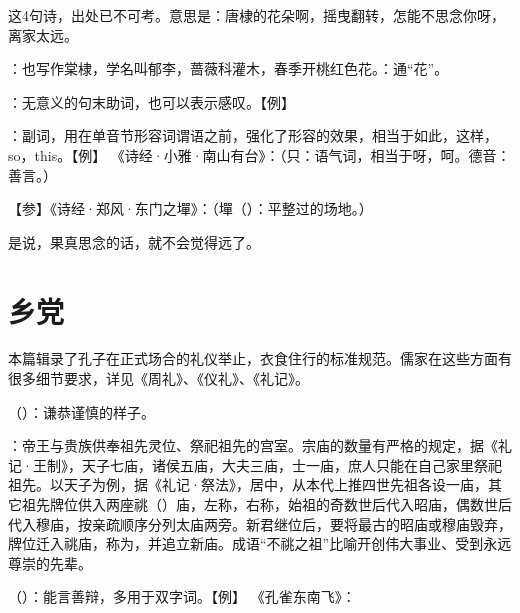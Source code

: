 {
\item {}这4句诗，出处已不可考。意思是：唐棣的花朵啊，摇曳翻转，怎能不思念你呀，离家太远。

：也写作棠棣，学名叫郁李，蔷薇科灌木，春季开桃红色花。：通“花”。

：无意义的句末助词，也可以表示感叹。【例】 

：副词，用在单音节形容词谓语之前，强化了形容的效果，相当于如此，这样，so，this。【例】 《诗经·小雅·南山有台》：（只：语气词，相当于呀，呵。德音：善言。）

【参】《诗经·郑风·东门之墠》：（墠（）：平整过的场地。）

\item {}是说，果真思念的话，就不会觉得远了。
}
{}



\chapter{乡党}

本篇辑录了孔子在正式场合的礼仪举止，衣食住行的标准规范。儒家在这些方面有很多细节要求，详见《周礼》、《仪礼》、《礼记》。%

\bigskip

{
\item {}（）：谦恭谨慎的样子。
\item {}：帝王与贵族供奉祖先灵位、祭祀祖先的宫室。宗庙的数量有严格的规定，据《礼记·王制》，天子七庙，诸侯五庙，大夫三庙，士一庙，庶人只能在自己家里祭祀祖先。以天子为例，据《礼记·祭法》，居中，从本代上推四世先祖各设一庙，其它祖先牌位供入两座祧（）庙，左称，右称，始祖的奇数世后代入昭庙，偶数世后代入穆庙，按亲疏顺序分列太庙两旁。新君继位后，要将最古的昭庙或穆庙毁弃，牌位迁入祧庙，称为，并追立新庙。成语“不祧之祖”比喻开创伟大事业、受到永远尊崇的先辈。 %
\item {}（）：能言善辩，多用于双字词。【例】 《孔雀东南飞》：
}
{}



